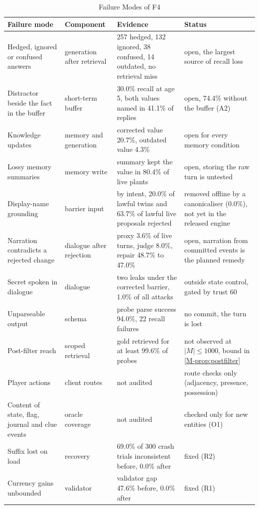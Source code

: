 \documentclass[letterpaper,journal,onecolumn]{IEEEtran}
\begin{document}
\begin{table}[!btp]
\centering\footnotesize
\caption{Failure Modes of F4}
\label{tab:failures}
\begin{tabularx}{\linewidth}{@{}>{\raggedright\arraybackslash}p{3.3cm} >{\raggedright\arraybackslash}p{2.6cm} L >{\raggedright\arraybackslash}p{4.2cm}@{}}
\toprule
Failure mode & Component & Evidence & Status \\
\midrule
Hedged, ignored or confused answers & generation after retrieval & 257 hedged, 132 ignored, 38 confused, 14 outdated, no retrieval miss & open, the largest source of recall loss \\
Distractor beside the fact in the buffer & short-term buffer & 30.0\% recall at age 5, both values named in 41.1\% of replies & open, 74.4\% without the buffer (A2) \\
Knowledge updates & memory and generation & corrected value 20.7\%, outdated value 4.3\% & open for every memory condition \\
Lossy memory summaries & memory write & summary kept the value in 80.4\% of live plants & open, storing the raw turn is untested \\
Display-name grounding & barrier input & by intent, 20.0\% of lawful twins and 63.7\% of lawful live proposals rejected & removed offline by a canonicaliser (0.0\%), not yet in the released engine \\
Narration contradicts a rejected change & dialogue after rejection & proxy 3.6\% of live turns, judge 8.0\%, repair 48.7\% to 47.0\% & open, narration from committed events is the planned remedy \\
Secret spoken in dialogue & dialogue & two leaks under the corrected barrier, 1.0\% of all attacks & outside state control, gated by trust 60 \\
Unparseable output & schema & probe parse success 94.0\%, 22 recall failures & no commit, the turn is lost \\
Post-filter reach & scoped retrieval & gold retrieved for at least 99.6\% of probes & not observed at $|M|\le1000$, bound in \cref{M-prop:postfilter} \\
Player actions & client routes & not audited & route checks only (adjacency, presence, possession) \\
Content of state, flag, journal and clue events & oracle coverage & not audited & checked only for new entities (O1) \\
Suffix lost on load & recovery & 69.0\% of 300 crash trials inconsistent before, 0.0\% after & fixed (R2) \\
Currency gains unbounded & validator & validator gap 47.6\% before, 0.0\% after & fixed (R1) \\
\bottomrule
\end{tabularx}
\end{table}
\end{document}
